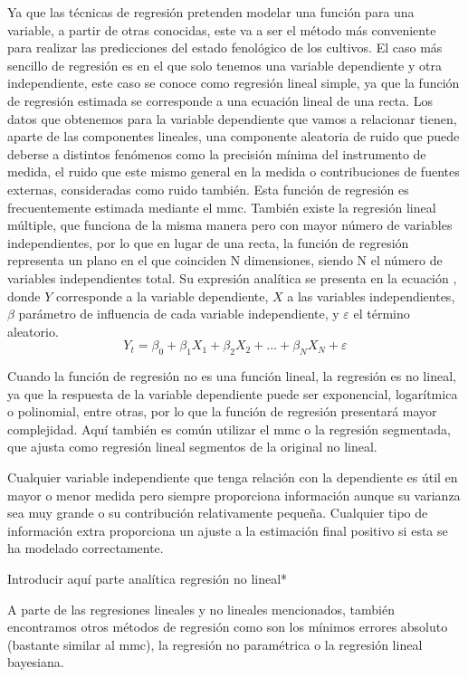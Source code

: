 \par Ya que las técnicas de regresión pretenden modelar una función para una variable, a partir de otras conocidas, este va a ser el método más conveniente para realizar las predicciones del estado fenológico de los cultivos. El caso más sencillo de regresión es en el que solo tenemos una variable dependiente y otra independiente, este caso se conoce como regresión lineal simple, ya que la función de regresión estimada se corresponde a una ecuación lineal de una recta. Los datos que obtenemos para la variable dependiente que vamos a relacionar tienen, aparte de las componentes lineales, una componente aleatoria de ruido que puede deberse a distintos fenómenos como la precisión mínima del instrumento de medida, el ruido que este mismo general en la medida o contribuciones de fuentes externas, consideradas como ruido también. Esta función de regresión es frecuentemente estimada mediante el \gls{mmc}. También existe la regresión lineal múltiple, que funciona de la misma manera pero con mayor número de variables independientes, por lo que en lugar de una recta, la función de regresión representa un plano en el que coinciden N dimensiones, siendo N el número de variables independientes total. Su expresión analítica se presenta en la ecuación \label{RL}, donde $Y$ corresponde a la variable dependiente, $X$ a las variables independientes, $\beta$ parámetro de influencia de cada variable independiente, y $\varepsilon$ el término aleatorio.
\\
\begin{equation} \label{RL}
Y_{t}=\beta _{0}+\beta _{1} X_{1}+\beta _{2} X_{2}+...+\beta _{N} X_{N}+\varepsilon 
\end{equation}
\par Cuando la función de regresión no es una función lineal, la regresión es no lineal, ya que la respuesta de la variable dependiente puede ser exponencial, logarítmica o polinomial, entre otras, por lo que la función de regresión presentará mayor complejidad. Aquí también es común utilizar el \gls{mmc} o la regresión segmentada, que ajusta como regresión lineal segmentos de la original no lineal.
\\
\par Cualquier variable independiente que tenga relación con la dependiente es útil en mayor o menor medida pero siempre proporciona información aunque su varianza sea muy grande o su contribución relativamente pequeña. Cualquier tipo de información extra proporciona un ajuste a la estimación final positivo si esta se ha modelado correctamente. 
\\
\par *Introducir aquí parte analítica regresión no lineal*
\\
\par A parte de las regresiones lineales y no lineales mencionados, también encontramos otros métodos de regresión como son los mínimos errores absoluto (bastante similar al \gls{mmc}), la regresión no paramétrica o la regresión lineal bayesiana.

